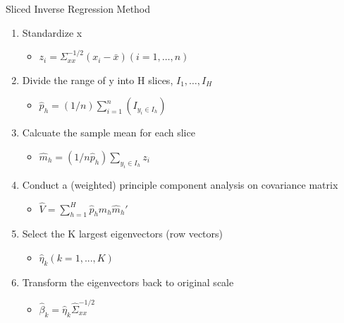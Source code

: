 \documentclass[ignorenonframetext,]{beamer}
\providecommand{\tightlist}{%
  \setlength{\itemsep}{0pt}\setlength{\parskip}{0pt}}
\begin{document}
\begin{frame}{Sliced Inverse Regression Method}

\begin{enumerate}
\def\labelenumi{\arabic{enumi}.}
\tightlist
\item
  Standardize x

  \begin{itemize}
  \tightlist
  \item
    \(z_i = \Sigma_{xx}^{-1/2}(x_i - \bar{x})(i = 1, \dots, n)\)
  \end{itemize}
\item
  Divide the range of y into H slices, \(I_1, \dots , I_H\)

  \begin{itemize}
  \tightlist
  \item
    \(\hat{p}_h = (1/n)\sum_{i=1}^n(I_{y_i\in I_h})\)
  \end{itemize}
\item
  Calcuate the sample mean for each slice

  \begin{itemize}
  \tightlist
  \item
    \(\hat{m}_h = (1/n\hat{p}_h) \sum_{y_i \in I_h}z_i\)
  \end{itemize}
\item
  Conduct a (weighted) principle component analysis on covariance matrix

  \begin{itemize}
  \tightlist
  \item
    \(\hat{V} = \sum_{h=1}^{H} \hat{p}_h\hat{m}_h\hat{m}_h'\)
  \end{itemize}
\item
  Select the K largest eigenvectors (row vectors)

  \begin{itemize}
  \tightlist
  \item
    \(\hat{\eta}_k (k = 1, ... , K)\)
  \end{itemize}
\item
  Transform the eigenvectors back to original scale

  \begin{itemize}
  \tightlist
  \item
    \(\hat{\beta}_k = \hat{\eta}_k \hat{\Sigma}_{xx}^{-1/2}\)
  \end{itemize}
\end{enumerate}

\end{frame}
\end{document}
